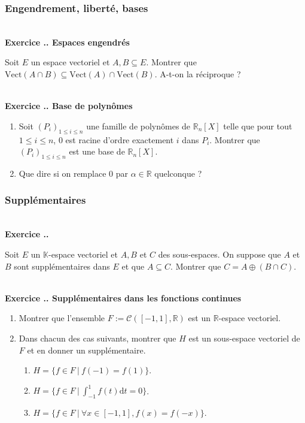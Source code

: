\documentclass{article}
\newcommand{\di}{\mathrm{d}}
\newcommand{\mb}[1]{\mathbb{#1}}
\newcommand{\mc}[1]{\mathcal{#1}}
\newcounter{exo}
\newcommand{\exercice}[1][\null]{\textbf{\\ Exercice \thesection.\theexo. #1} \addtocounter{exo}{1}}
\begin{document}
\subsubsection{Engendrement, liberté, bases}

\exercice[Espaces engendrés]

Soit $E$ un espace vectoriel et $A,B \subseteq E$. Montrer que $\text{Vect}(A \cap B) \subseteq \text{Vect}(A) \cap \text{Vect}(B)$. A-t-on la réciproque ?


\exercice[Base de polynômes]

\begin{enumerate}

\item Soit $(P_i)_{1 \le i \le n}$ une famille de polynômes de $\mb{R}_n[X]$ telle que pour tout $1 \le i \le n$, $0$ est racine d'ordre exactement $i$ dans $P_i$. Montrer que $(P_i)_{1 \le i \le n}$ est une base de $\mb{R}_n[X]$.

\item Que dire si on remplace $0$ par $\alpha \in \mb{R}$ quelconque ?

\end{enumerate}



\subsubsection{Supplémentaires}


\exercice

Soit $E$ un $\mb{K}$-espace vectoriel et $A,B$ et $C$ des sous-espaces. On suppose que $A$ et $B$ sont supplémentaires dans $E$ et que $A \subseteq C$. Montrer que $C = A \oplus (B \cap C)$.





\exercice[Supplémentaires dans les fonctions continues]

\begin{enumerate}

\item Montrer que l'ensemble $F := \mc{C}([-1,1], \mb{R})$ est un $\mb{R}$-espace vectoriel.

\item Dans chacun des cas suivants, montrer que $H$ est un sous-espace vectoriel de $F$ et en donner un supplémentaire.

\begin{enumerate}

\item $H = \{f \in F~|~f(-1) = f(1)\}$.

\item $H = \{ f \in F~|~\int_{-1}^1 f(t) \di t = 0\}$.

\item $H = \{ f \in F~|~\forall x \in [-1,1], f(x) = f(-x)\}$.


\end{enumerate}


\end{enumerate}
\end{document}
